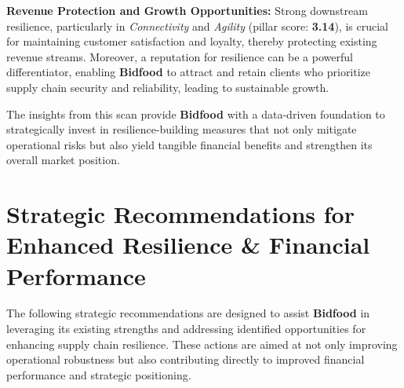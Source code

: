 \documentclass[
  oneside,
  open=any,
  fontsize=11pt]{scrbook}
\begin{document}
\textbf{Revenue Protection and Growth Opportunities:} Strong downstream
resilience, particularly in \emph{Connectivity} and \emph{Agility}
(pillar score: \textbf{3.14}), is crucial for maintaining customer
satisfaction and loyalty, thereby protecting existing revenue streams.
Moreover, a reputation for resilience can be a powerful differentiator,
enabling \textbf{Bidfood} to attract and retain clients who prioritize
supply chain security and reliability, leading to sustainable growth.

The insights from this scan provide \textbf{Bidfood} with a data-driven
foundation to strategically invest in resilience-building measures that
not only mitigate operational risks but also yield tangible financial
benefits and strengthen its overall market position.

\chapter{Strategic Recommendations for Enhanced Resilience \& Financial
Performance}\label{strategic-recommendations-for-enhanced-resilience-financial-performance}

The following strategic recommendations are designed to assist
\textbf{Bidfood} in leveraging its existing strengths and addressing
identified opportunities for enhancing supply chain resilience. These
actions are aimed at not only improving operational robustness but also
contributing directly to improved financial performance and strategic
positioning.
\end{document}
